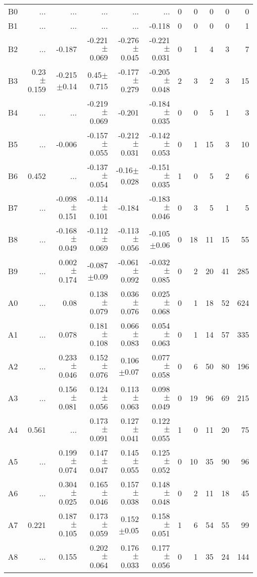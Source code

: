 \begin{table}[t]
\begin{table}[t]
\begin{center}
\begin{tabular}{c|rrrrr|rrrrr}
    B0	&	 ...	&	 ...	&	 ...	&	 ...	&	 ...	&	0	&	0	&	0	&	0	&	0	\\
    B1	&	 ...	&	 ...	&	 ...	&	 ...	&	-0.118	&	0	&	0	&	0	&	0	&	1	\\
    B2	&	 ...	&	-0.187	&	-0.221$\pm$0.069	&	-0.276$\pm$0.045	&	-0.221$\pm$0.031	&	0	&	1	&	4	&	3	&	7	\\
    B3	&	0.23$\pm$0.159	&	-0.215$\pm$0.14	&	0.45$\pm$0.715	&	-0.177$\pm$0.279	&	-0.205$\pm$0.048	&	2	&	3	&	2	&	3	&	15	\\
    B4	&	 ...	&	 ...	&	-0.219$\pm$0.069	&	-0.201	&	-0.184$\pm$0.035	&	0	&	0	&	5	&	1	&	3	\\
    B5	&	 ...	&	-0.006	&	-0.157$\pm$0.055	&	-0.212$\pm$0.031	&	-0.142$\pm$0.053	&	0	&	1	&	15	&	3	&	10	\\
    B6	&	0.452	&	 ...	&	-0.137$\pm$0.054	&	-0.16$\pm$0.028	&	-0.151$\pm$0.035	&	1	&	0	&	5	&	2	&	6	\\
    B7	&	 ...	&	-0.098$\pm$0.151	&	-0.114$\pm$0.101	&	-0.184	&	-0.183$\pm$0.046	&	0	&	3	&	5	&	1	&	5	\\
    B8	&	 ...	&	-0.168$\pm$0.049	&	-0.112$\pm$0.069	&	-0.113$\pm$0.056	&	-0.105$\pm$0.06	&	0	&	18	&	11	&	15	&	55	\\
    B9	&	 ...	&	0.002$\pm$0.174	&	-0.087$\pm$0.09	&	-0.061$\pm$0.092	&	-0.032$\pm$0.085	&	0	&	2	&	20	&	41	&	285	\\
    A0	&	 ...	&	0.08	&	0.138$\pm$0.079	&	0.036$\pm$0.076	&	0.025$\pm$0.068	&	0	&	1	&	18	&	52	&	624	\\
    A1	&	 ...	&	0.078	&	0.181$\pm$0.108	&	0.066$\pm$0.083	&	0.054$\pm$0.063	&	0	&	1	&	14	&	57	&	335	\\
    A2	&	 ...	&	0.233$\pm$0.046	&	0.152$\pm$0.076	&	0.106$\pm$0.07	&	0.077$\pm$0.058	&	0	&	6	&	50	&	80	&	196	\\
    A3	&	 ...	&	0.156$\pm$0.081	&	0.124$\pm$0.056	&	0.113$\pm$0.063	&	0.098$\pm$0.049	&	0	&	19	&	96	&	69	&	215	\\
    A4	&	0.561	&	 ...	&	0.173$\pm$0.091	&	0.127$\pm$0.041	&	0.122$\pm$0.055	&	1	&	0	&	11	&	20	&	75	\\
    A5	&	 ...	&	0.199$\pm$0.074	&	0.147$\pm$0.047	&	0.145$\pm$0.055	&	0.125$\pm$0.052	&	0	&	10	&	35	&	90	&	96	\\
    A6	&	 ...	&	0.304$\pm$0.025	&	0.165$\pm$0.046	&	0.157$\pm$0.038	&	0.148$\pm$0.048	&	0	&	2	&	11	&	18	&	45	\\
    A7	&	0.221	&	0.187$\pm$0.105	&	0.173$\pm$0.059	&	0.152$\pm$0.05	&	0.158$\pm$0.051	&	1	&	6	&	54	&	55	&	99	\\
    A8	&	 ...	&	0.155	&	0.202$\pm$0.064	&	0.176$\pm$0.033	&	0.177$\pm$0.056	&	0	&	1	&	35	&	24	&	144	\\

\end{tabular}
\end{center}
\end{table}
\end{table}
